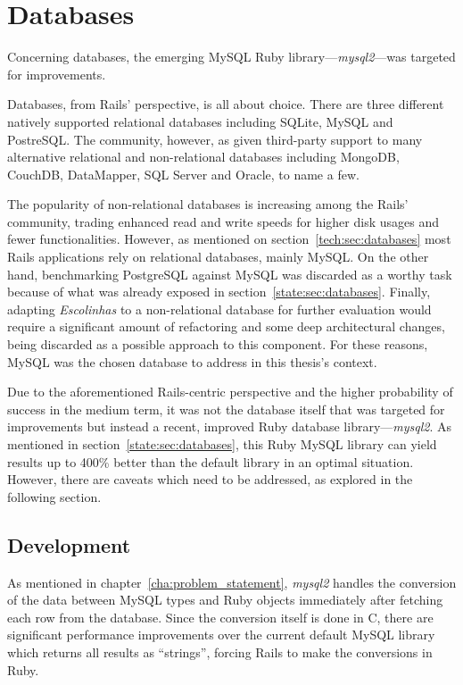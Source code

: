 \section{Databases} %
\label{solution:sec:databases}

Concerning databases, the emerging MySQL Ruby library---\textit{mysql2}---was targeted for improvements.

Databases, from Rails' perspective, is all about choice. There are three different natively supported relational databases including SQLite, MySQL and PostreSQL. The community, however, as given third-party support to many alternative relational and non-relational databases including MongoDB, CouchDB, DataMapper, SQL Server and Oracle, to name a few.

The popularity of non-relational databases is increasing among the Rails' community, trading enhanced read and write speeds for higher disk usages and fewer functionalities. However, as mentioned on section~\ref{tech:sec:databases} most Rails applications rely on relational databases, mainly MySQL. On the other hand, benchmarking PostgreSQL against MySQL was discarded as a worthy task because of what was already exposed in section~\ref{state:sec:databases}. Finally, adapting \textit{Escolinhas} to a non-relational database for further evaluation would require a significant amount of refactoring and some deep architectural changes, being discarded as a possible approach to this component. For these reasons, MySQL was the chosen database to address in this thesis's context.

Due to the aforementioned Rails-centric perspective and the higher probability of success in the medium term, it was not the database itself that was targeted for improvements but instead a recent, improved Ruby database library---\textit{mysql2}. As mentioned in section~\ref{state:sec:databases}, this Ruby MySQL library can yield results up to 400\% better than the default library in an optimal situation. However, there are caveats which need to be addressed, as explored in the following section.

\subsection{Development}
As mentioned in chapter~\ref{cha:problem_statement}, \textit{mysql2} handles the conversion of the data between MySQL types and Ruby objects immediately after fetching each row from the database. Since the conversion itself is done in C, there are significant performance improvements over the current default MySQL library which returns all results as ``strings'', forcing Rails to make the conversions in Ruby. 

